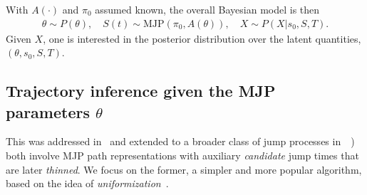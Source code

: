 With $A(\cdot)$ and $\pi_0$ assumed known, the overall Bayesian model is then 
\begin{align}
  \label{eq:bayes_model}
  \theta \sim P(\theta), \quad S(t) \sim \text{MJP}(\pi_0, A(\theta)), \quad X \sim P(X|s_0,S,T).
\end{align}
Given $X$, one is interested in the posterior distribution over the latent quantities, $(\theta,s_0, S, T)$. 

\subsection{Trajectory inference given the MJP parameters $\theta$}
This was addressed in~\citet{RaoTeh13}  and extended to a broader class of jump processes in~\cite{RaoTeh12}~\citep[also see][]{FearnSher2006, Hobolth09, Elhaygibbssampling}) 
\citet{RaoTeh13,RaoTeh12} both involve MJP path representations with auxiliary {\em candidate} jump times that are later {\em thinned}.  
We focus on the former, a simpler and more popular algorithm, based on the idea of {\em uniformization}~\citep{Jen1953}. 

